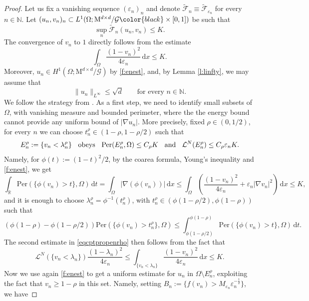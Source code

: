 \documentclass[a4paper,reqno]{amsart}
\newcommand\R{\mathbb{R}}
\newcommand\N{\mathbb{N}}
\newcommand\calL{\mathcal{L}}
\newcommand\eps{{\varepsilon}}
\newcommand\dt{{\,\mathrm{d}t}}
\newcommand{\Per}{\mathrm{Per}}
\theoremstyle{remark}
\newcommand{\EEE}{\color{black}}
\newcommand\dx{{\,\mathrm{d}x}}
\newcommand{\F}{\mathcal{F}}
\newcommand{\G}{\mathcal{G}}
\newcommand{\tF}{\widetilde{\F}}
\newcommand{\Mno}{\mathrm{M}^{d\times d}}
\newcommand{\LN}{\calL^N}
\numberwithin{equation}{section}
\begin{document}
\begin{proof}
Let us fix a vanishing sequence $(\varepsilon_n)_n$ and denote  $\tF_n\equiv\tF_{\varepsilon_n}$ \EEE for every $n \in \N$.
	Let $(u_n, v_n)_n \subset L^1(\Omega;  \Mno/\G \EEE \times [0,1])$ be such that
\begin{equation}\label{f:enest}
    \sup_n \tF_n(u_n, v_n) \leq  K.
\end{equation}
	The convergence of $v_n$ to $1$  directly \EEE follows from the estimate 
\begin{equation}\label{eq1mvnepsto0}
\int_\Omega\frac{(1-v_n)^2}{4\eps_n}\dx\leq K.
\end{equation}
	Moreover,   $u_n \in H^1(\Omega; \Mno/\G)$ \EEE by \eqref{f:enest}, and,
	by Lemma \ref{l:linfty}, we may assume
	that 
	\begin{equation}\label{f:lixc}
\|u_n\|_{L^\infty}\le\sqrt d \qquad \text{for every } n\in\N.
	\end{equation}
We follow the strategy from \cite[Prop.~4.11]{ConFocIur25}.
As a first step, we need to identify small subsets of $\Omega$, with vanishing measure and bounded perimeter, where 
the the energy bound cannot provide any uniform bound of $|\nabla u_n|$. More precisely, fixed $\rho\in (0,1/2)$, for every $n$ we can choose $t_n^\rho\in (1-\rho, 1-\rho/2)$ such that
\begin{equation}\label{eqcptpropenrho}
	E_n^\rho:= \{v_n<\lambda_n^\rho\}\hskip2mm
	\text{ obeys }\hskip2mm
	\Per(E_n^\rho, \Omega)\le  C_\rho K
	\hskip2mm\text{ and }\hskip2mm
	\LN(E_n^\rho)\le C_\rho \eps_n K.
\end{equation}
Namely, for
$\phi(t):=(1-t)^2/2$, by the coarea formula, Young's inequality and \eqref{f:enest}, we get
\begin{equation}\label{eqestphit}
\int_\R \Per(\{\phi(v_n)>t\}, \Omega) \dt
=\int_\Omega |\nabla(\phi(v_n))| \dx \leq  \int_\Omega\left(\frac{(1-v_n)^2}{4\eps_n}+\eps_n|\nabla v_n|^2 \right) \dx \leq K,
\end{equation}
and it is enough to choose $\lambda^\rho_n=\phi^{-1}(t^\rho_n)$, with $t^\rho_n \in (\phi(1-\rho/2), \phi(1-\rho))$ such that
\[
\left(\phi(1-\rho)-\phi(1-\rho/2)\right) \Per(\{\phi(v_n)>t^\rho_n\}, \Omega) \leq  \int_{\phi(1-\rho/2)}^{\phi(1-\rho) } \Per(\{\phi(v_n)>t\}, \Omega) \dt.
\]
The second estimate in \eqref{eqcptpropenrho} then follows from the fact that
\[
\LN(\{v_n<\lambda_n\})\frac{(1-\lambda_n)^2}{4\varepsilon_n} \leq \int_{\{v_n<\lambda_n\}} \frac{(1-v_n)^2}{4\eps_n}  \dx
\leq K. 
\]
Now we use again \eqref{f:enest}  to get a uniform estimate for $u_n$ in $\Omega \setminus E_n^\rho$,  exploiting the fact that $v_n \geq 1-\rho$ in this set. Namely, setting $B_n:=\{ f(v_n)>M_{\varepsilon_n} \varepsilon_n^{-\frac12} \}$, we have

\end{proof}
\end{document}
